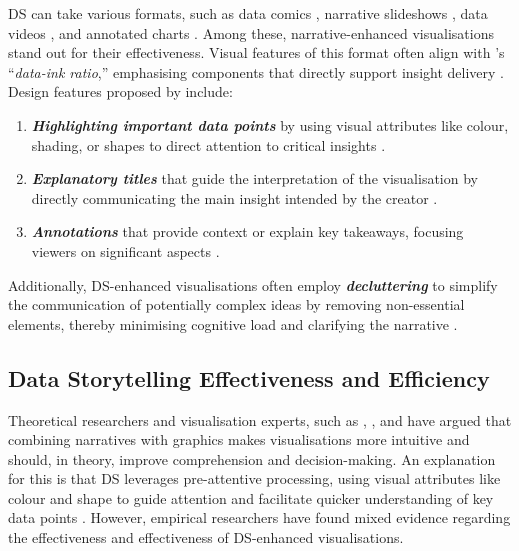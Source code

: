 DS can take various formats, such as data comics \cite{bach2017emerging, bach2018designpatterns, milesi2024comics}, narrative slideshows \cite{chen2019designing}, data videos \cite{amini2015datavideos, xian2023datavideos}, and annotated charts \cite{echeverria2018exploratory}. Among these, narrative-enhanced visualisations stand out for their effectiveness. Visual features of this format often align with \citet{tufte2001visual}'s “\textit{data-ink ratio},” emphasising components that directly support insight delivery \cite{knaflic2015storytelling, zdanovic2022influence}. Design features proposed by \citet{knaflic2015storytelling} include: 
\begin{enumerate}
    \item \textit{\textbf{Highlighting important data points}} by using visual attributes like colour, shading, or shapes to direct attention to critical insights \cite{ryan2016visual,hullman2011visualization}.
    \item \textit{\textbf{Explanatory titles}} that guide the interpretation of the visualisation by directly communicating the main insight intended by the creator \cite{borkin2016beyond, echeverria2018exploratory}. 
    \item \textit{\textbf{Annotations}} that provide context or explain key takeaways, focusing viewers on significant aspects \cite{hullman2011visualization, knaflic2015storytelling}.
\end{enumerate}

Additionally, DS-enhanced visualisations often employ \textit{\textbf{decluttering}} to simplify the communication of potentially complex ideas by removing non-essential elements, thereby minimising cognitive load and clarifying the narrative \cite{hullman2011visualization, knaflic2015storytelling}.

\subsection{Data Storytelling Effectiveness and Efficiency}
Theoretical researchers and visualisation experts, such as \citet{segel2010narrative}, \citet{gershon2001}, and \citet{Daradkeh2021} have argued that combining narratives with graphics makes visualisations more intuitive and should, in theory, improve comprehension and decision-making. An explanation for this is that DS leverages pre-attentive processing, using visual attributes like colour and shape to guide attention and facilitate quicker understanding of key data points \cite{krum2013cool,Hicks2009perceptual, knaflic2015storytelling}. However, empirical researchers have found mixed evidence regarding the effectiveness and effectiveness of DS-enhanced visualisations.  

